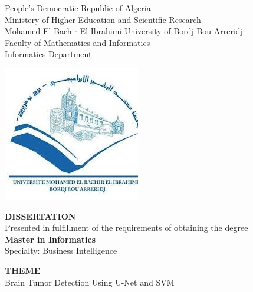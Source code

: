 
\thispagestyle{empty}
\begin{center}
  \begin{spacing}{1.15}
    People’s Democratic Republic of Algeria \\
    Ministery of Higher Education and Scientific Research \\
    Mohamed El Bachir El Ibrahimi University of Bordj Bou Arreridj\\
    Faculty of Mathematics and Informatics\\
    Informatics Department\\
    \vspace{0.5cm}

    \includegraphics[scale=0.5]{Images/logo.jpeg}


    \fontsize{13}{15}\selectfont \textbf{DISSERTATION}\\
    Presented in fulfillment of the requirements of obtaining the degree\\
    \fontsize{13}{15}\selectfont \textbf{Master in Informatics} \\
    Specialty: Business Intelligence\\


    \vspace{1.5cm}

    \fontsize{17}{20}\selectfont \textbf{THEME} \\
    \fontsize{20}{22}\selectfont Brain Tumor Detection Using U-Net and SVM\\

  \end{spacing}
\end{center}

\vspace{0.5cm}

